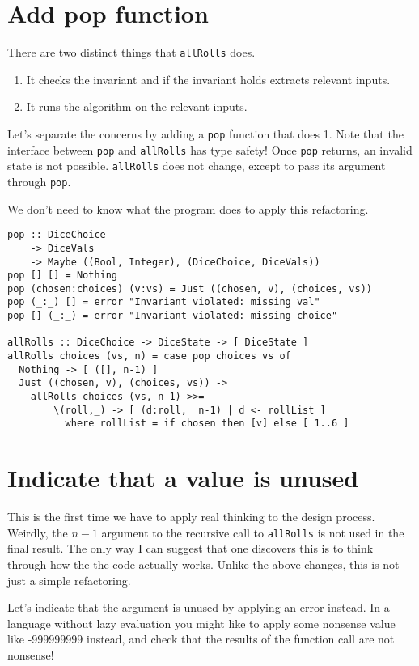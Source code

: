 \section{Add pop function}

There are two distinct things that \texttt{allRolls} does.

\begin{enumerate}
\item It checks the invariant and if the invariant holds extracts relevant inputs.
\item It runs the algorithm on the relevant inputs.
\end{enumerate}
Let's separate the concerns by adding a \texttt{pop} function that does 1. Note that the interface between \texttt{pop} and \texttt{allRolls} has type safety! Once \texttt{pop} returns, an invalid state is not possible. \texttt{allRolls} does not change, except to pass its argument through \texttt{pop}.

We don't need to know what the program does to apply this refactoring.

\begin{verbatim}
pop :: DiceChoice
    -> DiceVals
    -> Maybe ((Bool, Integer), (DiceChoice, DiceVals))
pop [] [] = Nothing
pop (chosen:choices) (v:vs) = Just ((chosen, v), (choices, vs))
pop (_:_) [] = error "Invariant violated: missing val"
pop [] (_:_) = error "Invariant violated: missing choice"

allRolls :: DiceChoice -> DiceState -> [ DiceState ]
allRolls choices (vs, n) = case pop choices vs of
  Nothing -> [ ([], n-1) ]
  Just ((chosen, v), (choices, vs)) ->
    allRolls choices (vs, n-1) >>=
        \(roll,_) -> [ (d:roll,  n-1) | d <- rollList ]
          where rollList = if chosen then [v] else [ 1..6 ]
\end{verbatim}


\section{Indicate that a value is unused}


This is the first time we have to apply real thinking to the design process. Weirdly, the $n-1$ argument to the recursive call to \texttt{allRolls} is not used in the final result. The only way I can suggest that one discovers this is to think through how the the code actually works. Unlike the above changes, this is not just a simple refactoring.

Let's indicate that the argument is unused by applying an error instead. In a language without lazy evaluation you might like to apply some nonsense value like -999999999 instead, and check that the results of the function call are not nonsense!

